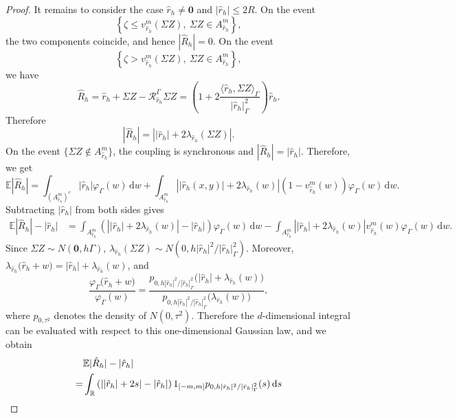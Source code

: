 \documentclass[aap]{imsart}
\theoremstyle{plain}
\theoremstyle{definition}
\begin{document}
\begin{proof}
It remains to consider the case \(\hat r_h\neq\mathbf 0\) and \(|\hat r_h|\leqslant 2R\). On the event
\[\left\{\zeta\leqslant v_{\hat r_h}^m(\Sigma Z),
	\ \Sigma Z\in A_{\hat r_h}^m\right\},\]
the two components coincide, and hence \(|\hat{R}_h|=0\).
On the event
\[\left\{\zeta
	>v_{\hat r_h}^m(\Sigma Z),\ \Sigma Z\in A_{\hat r_h}^m
	\right\},\]
we have
\[\hat{R}_h
=\hat r_h+\Sigma Z-\mathcal R_{\hat r_h}^\Gamma\Sigma Z=
\left(1+2\frac{\langle \hat r_h,\Sigma Z\rangle_\Gamma}{
|\hat r_h|_\Gamma^2}\right)\hat r_h.\]
Therefore
\begin{equation}\label{refR}
|\hat{R}_h|=\left|
	|\hat r_h|+2\lambda_{\hat r_h}(\Sigma Z)\right|.
\end{equation}
On the event \(\{\Sigma Z\notin A_{\hat r_h}^m\}\), the coupling is
synchronous and \(|\hat{R}_h|
=|\hat r_h|\).
Therefore, we get
	\[\mathbb E|\hat{R}_h|=
		\int_{(A_{\hat r_h}^m)^c}
		|\hat r_h|\varphi_\Gamma(w)\,\mathrm dw+
		\int_{A_{\hat r_h}^m}
		\left|
		|\hat r_h(x,y)|
		+
		2\lambda_{\hat r_h}(w)
		\right|
		\left(
		1-v_{\hat r_h}^m(w)
		\right)
		\varphi_\Gamma(w)\,\mathrm dw .\]
	Subtracting \(|\hat r_h|\) from both sides gives
	\[
	\begin{aligned}
	\mathbb E|\hat{R}_h|
		-|\hat r_h|&=
		\int_{A_{\hat r_h}^m}
		\left(
		\left|
		|\hat r_h|
		+
		2\lambda_{\hat r_h}(w)
		\right|
		-
		|\hat r_h|
		\right)
		\varphi_\Gamma(w)\,\mathrm dw-
		\int_{A_{\hat r_h}^m}
		\left|
		|\hat r_h|
		+
		2\lambda_{\hat r_h}(w)
		\right|
		v_{\hat r_h}^m(w)
		\varphi_\Gamma(w)\,\mathrm dw .
	\end{aligned}
	\]	
	Since \(\Sigma Z\sim N(\mathbf 0,h\Gamma)\), \(\lambda_{\hat r_h}(\Sigma Z)
	\sim
	N\left(
	0,
	h|\hat r_h|^2/|\hat r_h|_\Gamma^2
	\right)\).
	Moreover, \(\lambda_{\hat r_h}
	\bigl(\hat r_h+w\bigr)
	=
	|\hat r_h|
	+
	\lambda_{\hat r_h}(w)\),
	and
	\[\frac{\varphi_\Gamma\bigl(\hat r_h+w\bigr)}{\varphi_\Gamma(w)}=
		\frac{p_{0,h|\hat r_h|^2/|\hat r_h|_\Gamma^2}
			\bigl(|\hat r_h|+\lambda_{\hat r_h}(w)
			\bigr)}{p_{0,h|\hat r_h|^2/|\hat r_h|_\Gamma^2}
			\bigl(\lambda_{\hat r_h}(w)\bigr)},\]
	where \(p_{0,\tau^2}\) denotes the density of \(N(0,\tau^2)\).
	Therefore the \(d\)-dimensional integral can be evaluated with respect to this
	one-dimensional Gaussian law, and we obtain
	\[
	\begin{aligned}
		&\mathbb E|\hat{R}_h|
		-|\hat r_h|\\
		=&
		\int_{\R}
		\left(
		\left|
		|\hat r_h|+2s
		\right|
		-
		|\hat r_h|
		\right)1_{[-m,m]}
		p_{0,h|\hat r_h|^2/|\hat r_h|_\Gamma^2}(s)
		\,\mathrm ds                                      \\

\end{aligned}\]
\end{proof}
\end{document}
